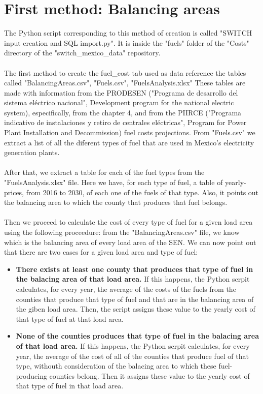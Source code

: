 \documentclass{article}
\begin{document}
\section{First method: Balancing areas}
The Python script corresponding to this method of creation is called "SWITCH input creation and SQL import.py". It is inside the "fuels" folder of the "Costs" directory of the "switch\_mexico\_data" repository.
\\
\\The first method to create the fuel\_cost tab used as data reference the tables called "BalancingAreas.csv", "Fuels.csv", "FuelsAnalysis.xlsx" These tables are made with information from the PRODESEN ("Programa de desarrollo del sistema eléctrico nacional", Development program for the national electric system)\cite{prodesen}, especifically, from the chapter 4\cite{prodesen4}, and from the PIIRCE ("Programa indicativo de instalaciones y retiro de centrales eléctricas", Program for Power Plant Installation and Decommission) fuel costs projections\cite{piircef}. From "Fuels.csv" we extract a list of all the diferent types of fuel that are used in Mexico's electricity generation plants.
\\
\\After that, we extract a table for each of the fuel types from the "FuelsAnalysis.xlsx" file. Here we have, for each type of fuel, a table of yearly-prices, from 2016 to 2030, of each one of the fuels of that type. Also, it points out the balancing area to which the county that produces that fuel belongs.
\\
\\Then we proceed to calculate the cost of every type of fuel for a given load area using the following proceedure: from the "BalancingAreas.csv" file, we know which is the balancing area of every load area of the SEN. We can now point out that there are two cases for a given load area and type of fuel:
\begin{itemize}
\item \textbf{There exists at least one county that produces that type of fuel in the balacing area of that load area.} If this happens, the Python scrpit calculates, for every year, the average of the costs of the fuels from the counties that produce that type of fuel and that are in the balancing area of the giben load area. Then, the script assigns these value to the yearly cost of that type of fuel at that load area.
\item \textbf{None of the counties produces that type of fuel in the balacing area of that load area.} If this happens, the Python scrpit calculates, for every year, the average of the cost of all of the counties that produce fuel of that type, withouth consideration of the balacing area to which these fuel-producing counties belong. Then it assigns these value to the yearly cost of that type of fuel in that load area.
\end{itemize}
\end{document}
